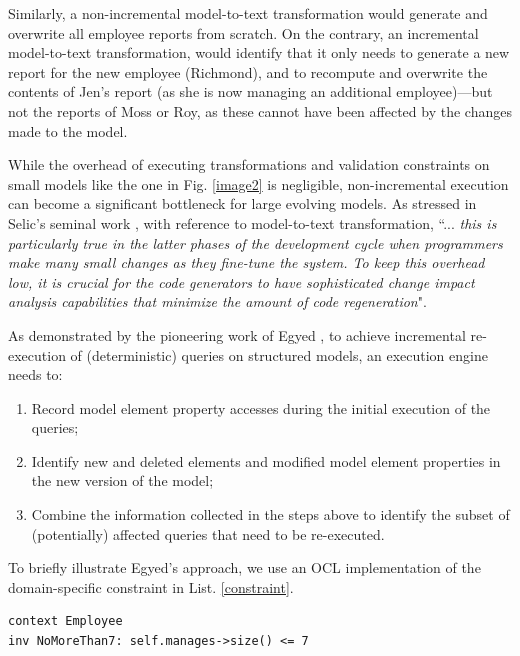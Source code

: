 \documentclass{llncs}
\begin{document}
Similarly, a non-incremental model-to-text transformation would generate and overwrite all employee reports from scratch. On the contrary, an incremental model-to-text transformation, would identify that it only needs to generate a new report for the new employee (Richmond), and to recompute and overwrite the contents of Jen's report (as she is now managing an additional employee)---but not the reports of Moss or Roy, as these cannot have been affected by the changes made to the model.

While the overhead of executing transformations and validation constraints on small models like the one in Fig. \ref{image2} is negligible, non-incremental execution can become a significant bottleneck for large evolving models. As stressed in Selic’s seminal work \cite{selic2003pragmatics}, with reference to model-to-text transformation, ``... \emph{this is particularly true in the latter phases of the development cycle when programmers make many small changes as they fine-tune the system. To keep this overhead low, it is crucial for the code generators to have sophisticated change impact analysis capabilities that minimize the amount of code regeneration}".

As demonstrated by the pioneering work of Egyed \cite{egyed2011automatically}, to achieve incremental re-execution of (deterministic) queries on structured models, an execution engine needs to:

\begin{enumerate}
\item Record model element property accesses during the initial execution of the queries;
\item Identify new and deleted elements and modified model element properties in the new version of the model;
\item Combine the information collected in the steps above to identify the subset of (potentially) affected queries that need to be re-executed.
\end{enumerate}

To brieﬂy illustrate Egyed’s approach, we use an OCL implementation of the domain-specific constraint in List. \ref{constraint}.

\begin{lstlisting}[style=ocl,caption={OCL constraint requiring that no employee directly manages more than 7 other employees.},label=constraint]
context Employee
inv NoMoreThan7: self.manages->size() <= 7
\end{lstlisting}
\end{document}
